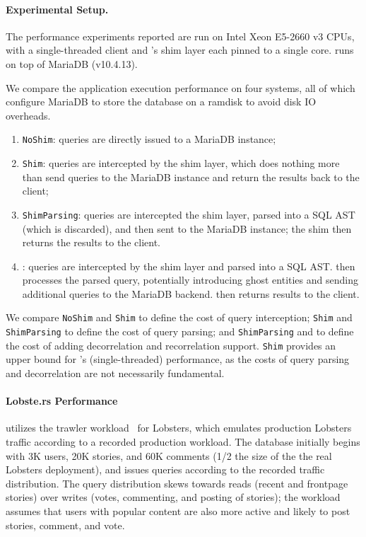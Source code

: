 \paragraph{Experimental Setup.}
The performance experiments reported are run on Intel Xeon E5-2660 v3 CPUs, with a
single-threaded client and \sys's shim layer each pinned to a single core. \sys runs on top of 
MariaDB (v10.4.13). 

We compare the application execution performance on four systems, all of which configure MariaDB to
store the database on a ramdisk to avoid disk IO overheads.
\begin{enumerate}
    \item \texttt{NoShim}: queries are directly issued to a MariaDB instance;
    \item \texttt{Shim}: queries are intercepted by the shim layer,
        which does nothing more than send queries to the MariaDB instance and
        return the results back to the client;
    \item \texttt{ShimParsing}: queries are intercepted the shim layer, parsed into a
        SQL AST (which is discarded), and then sent to the MariaDB instance; the shim then returns the results to the
        client. 
    \item \texttt{\sys}: queries are intercepted by the shim layer and parsed into a SQL AST. \sys
        then processes the parsed query, potentially introducing ghost entities and sending additional queries to the MariaDB backend.
        \sys then returns results to the client.
\end{enumerate}

We compare \texttt{NoShim} and \texttt{Shim} to define the cost of query interception; \texttt{Shim}
and \texttt{ShimParsing} to define the cost of query parsing; and \texttt{ShimParsing} and
\texttt{\sys} to define the cost of adding decorrelation and recorrelation support.  \texttt{Shim}
provides an upper bound for \sys's (single-threaded) performance, as the costs of query parsing
and decorrelation are not necessarily fundamental.

\paragraph{Lobste.rs Performance}
\sys utilizes the trawler workload~\cite{trawler} for Lobsters, which emulates production
Lobsters traffic according to a recorded production workload. The database initially begins with 3K
users, 20K stories, and 60K comments (1/2 the size of the the real Lobsters deployment), and issues
queries according to the recorded traffic distribution. The query distribution skews towards reads
(recent and frontpage stories) over writes (votes, commenting, and posting of stories); the
workload assumes that users with popular content are also more active and likely to post stories,
comment, and vote.

